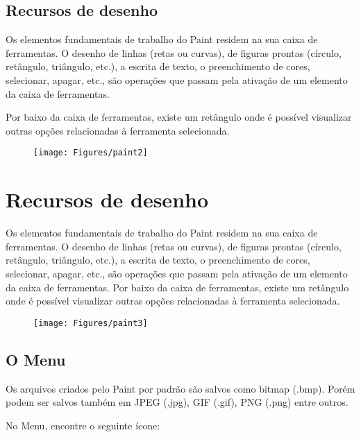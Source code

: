 \documentclass[hidelinks,12pt]{article}
\begin{document}
			\subsection{Recursos de desenho}	
			
			Os elementos fundamentais de trabalho do Paint residem na sua caixa de ferramentas. O desenho de linhas (retas ou curvas), de figuras prontas (círculo, retângulo, triângulo, etc.), a escrita de texto, o preenchimento de cores, selecionar, apagar, etc., são operações que passam pela ativação de um elemento da caixa de ferramentas. 
			
			Por baixo da caixa de ferramentas, existe um retângulo onde é possível visualizar outras opções relacionadas à ferramenta selecionada.
			
			
			\begin{figure}[!h]
				\centering
				\texttt{[image: Figures/paint2]}
				\label{fig:paint2}
			\end{figure}
			
			\section{Recursos de desenho}
			
			Os elementos fundamentais de trabalho do Paint residem na sua caixa de ferramentas. O desenho de linhas (retas ou curvas), de figuras prontas (círculo, retângulo, triângulo, etc.), a escrita de texto, o preenchimento de cores, selecionar, apagar, etc., são operações que passam pela ativação de um elemento da caixa de ferramentas. Por baixo da caixa de ferramentas, existe um retângulo onde é possível visualizar outras opções relacionadas à ferramenta selecionada.
			
			
				
			\begin{figure}[!h]
				\centering
				\texttt{[image: Figures/paint3]}
				\label{fig:paint3}
			\end{figure}
			
		
			\subsection{O Menu}
			
			Os arquivos criados pelo Paint por padrão são salvos como bitmap (.bmp). Porém podem ser salvos também em JPEG (.jpg), GIF (.gif), PNG (.png) entre outros.
			
			No Menu, encontre o seguinte ícone:
			
\end{document}
